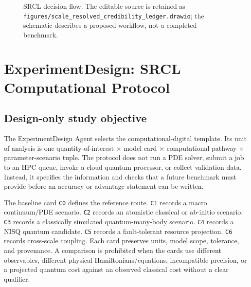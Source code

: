 \documentclass[conference]{../../../../Conference-LaTeX-template_10-17-19/IEEEtran}
\begin{document}
\begin{figure}[!t]
\centering
{}
\caption{SRCL decision flow. The editable source is retained as \texttt{figures/scale\_resolved\_credibility\_ledger.drawio}; the schematic describes a proposed workflow, not a completed benchmark.}
\label{fig:srcl}
\end{figure}

\section{ExperimentDesign: SRCL Computational Protocol}
\subsection{Design-only study objective}
The ExperimentDesign Agent selects the computational-digital template. Its unit of analysis is one quantity-of-interest $\times$ model card $\times$ computational pathway $\times$ parameter-scenario tuple. The protocol does not run a PDE solver, submit a job to an HPC queue, invoke a cloud quantum processor, or collect validation data. Instead, it specifies the information and checks that a future benchmark must provide before an accuracy or advantage statement can be written.

The baseline card \texttt{C0} defines the reference route. \texttt{C1} records a macro continuum/PDE scenario. \texttt{C2} records an atomistic classical or ab-initio scenario. \texttt{C3} records a classically simulated quantum-many-body scenario. \texttt{C4} records a NISQ quantum candidate. \texttt{C5} records a fault-tolerant resource projection. \texttt{C6} records cross-scale coupling. Each card preserves units, model scope, tolerance, and provenance. A comparison is prohibited when the cards use different observables, different physical Hamiltonians/equations, incompatible precision, or a projected quantum cost against an observed classical cost without a clear qualifier.
\end{document}
